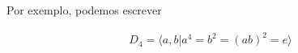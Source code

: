 	\par\vspace{0.3cm}
	
	
	
	
	
	
	
	
	\par\vspace{0.3cm} Por exemplo, podemos escrever 
	
	\begin{align}
	D_4 = \langle a,b | a^4 = b^2 = (ab)^2 = e \rangle
	\label{apresentacao d4}
	\end{align}
	
	

